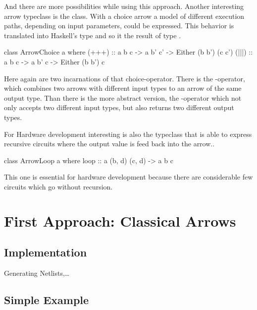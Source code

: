 \documentclass{article}
\begin{document}
\par
And there are more possibilities while using this approach. Another interesting arrow typeclass is the  class. With a choice
arrow a model of different execution paths, depending on input parameters, could be expressed. This behavior is translated into Haskell's
 type and so it the result of type . 

\begin{code}[]
class ArrowChoice a where
  (+++) :: a b c -> a b' c' -> Either (b b') (c c')
  (|||) :: a b c -> a b' c  -> Either (b b')  c 
\end{code}

Here again are two incarnations of that choice-operator. There is the \hs{(|||)}-operator, which combines two arrows with different input
types to an arrow of the same output type. Than there is the more abstract version, the \hs{(+++)}-operator which not only accepts two different input types, but also returns two different output types.  


\par
For Hardware development interesting is also the  typeclass that is able to express recursive circuits where the output value
is feed back into the arrow..
\begin{code}[]
class ArrowLoop a where
  loop :: a (b, d) (c, d) -> a b c
\end{code}

This one is essential for hardware development because there are considerable few circuits which go without recursion. 





\section{First Approach: Classical Arrows}

\subsection{Implementation}

Generating Netlists,\ldots

\subsection{Simple Example}
\end{document}

